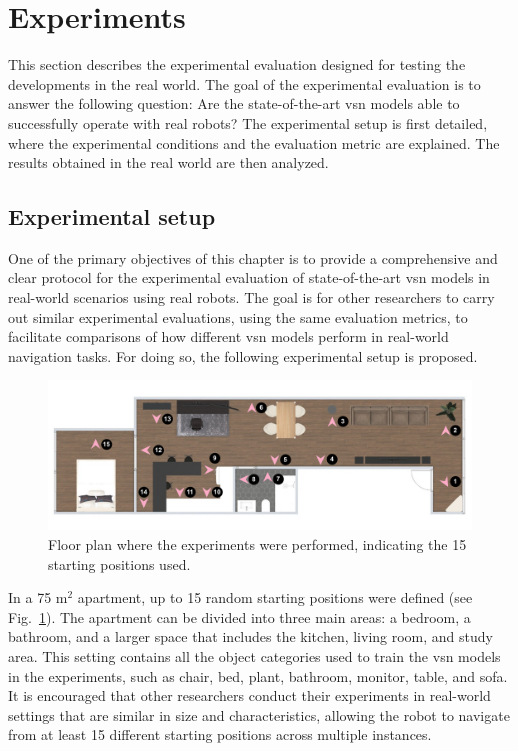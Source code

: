 \section{Experiments}\label{sec:experiments}
This section describes the experimental evaluation designed for testing the developments in the real world.
The goal of the experimental evaluation is to answer the following question: Are the state-of-the-art \acrshort{vsn} models able to successfully operate with real robots?
The experimental setup is first detailed, where the experimental conditions and the evaluation metric are explained.
The results obtained in the real world are then analyzed.

\subsection{Experimental setup}
\label{subsec:experimental_setup}

One of the primary objectives of this chapter is to provide a comprehensive and clear protocol for the experimental evaluation of state-of-the-art \acrshort{vsn} models in real-world scenarios using real robots.
The goal is for other researchers to carry out similar experimental evaluations, using the same evaluation metrics, to facilitate comparisons of how different \acrshort{vsn} models perform in real-world navigation tasks.
For doing so, the following experimental setup is proposed.

\begin{figure}[t]
    \centering
    \includegraphics[width=\linewidth]{figures/ros4vsn/plano_vivienda}
    \caption{Floor plan where the experiments were performed, indicating the 15 starting positions used.}
    \label{fig:floor_plan}
\end{figure}

In a 75 m$^2$ apartment, up to 15 random starting positions were defined (see Fig.~\ref{fig:floor_plan}).
The apartment can be divided into three main areas: a bedroom, a bathroom, and a larger space that includes the kitchen, living room, and study area.
This setting contains all the object categories used to train the \acrshort{vsn} models in the experiments, such as chair, bed, plant, bathroom, monitor, table, and sofa.
It is encouraged that other researchers conduct their experiments in real-world settings that are similar in size and characteristics, allowing the robot to navigate from at least 15 different starting positions across multiple instances.

